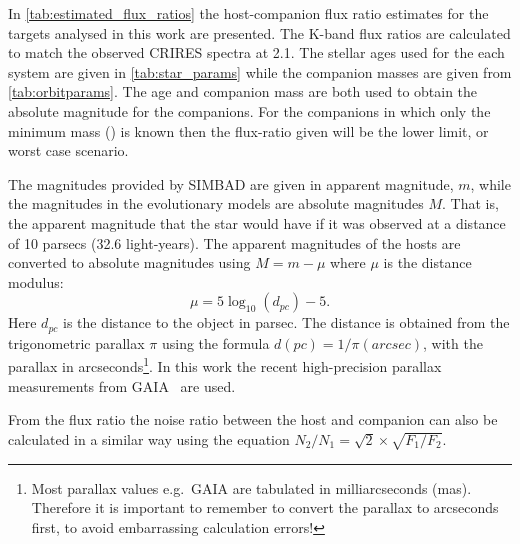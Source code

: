 In \cref{tab:estimated_flux_ratios} the host-companion flux ratio estimates for the targets analysed in this work are presented.
The {K}-band flux ratios are calculated to match the observed {CRIRES} spectra at 2.1\um{}.
The stellar ages used for the each system are given in \cref{tab:star_params} while the companion masses are given from \cref{tab:orbitparams}.
The age and companion mass are both used to obtain the absolute magnitude for the companions.
For the companions in which only the minimum mass (\Mtwosini{}) is known then the flux-ratio given will be the lower limit, or worst case scenario.


The magnitudes provided by {SIMBAD} are given in apparent magnitude, $m$, while the magnitudes in the evolutionary models are absolute magnitudes $M$.
That is, the apparent magnitude that the star would have if it was observed at a distance of 10 parsecs (32.6 light-years).
The apparent magnitudes of the hosts are converted to absolute magnitudes using \(M = m - \mu\) where \(\mu\) is the distance modulus:
\begin{equation}
\mu = 5 \log_{10}(d_{pc}) -5.\label{eqn:distance_modulus}
\end{equation}
Here $d_{pc}$ is the distance to the object in parsec.
The distance is obtained from the trigonometric parallax  $\pi$ using the formula $d(pc) = 1 /\pi(arcsec)$, with the parallax in arcseconds\footnote{Most parallax values e.g.\ GAIA are tabulated in milliarcseconds (mas).
Therefore it is important to remember to convert the parallax to arcseconds first, to avoid embarrassing calculation errors!}.
In this work the recent high-precision parallax measurements from GAIA~\citep{collaboration_gaia_2018} are used.

From the flux ratio the noise ratio between the host and companion can also be calculated in a similar way using the equation \(N_{2}/N_{1} = \sqrt{2} \times\sqrt{F_{1}/F_{2}}\).


